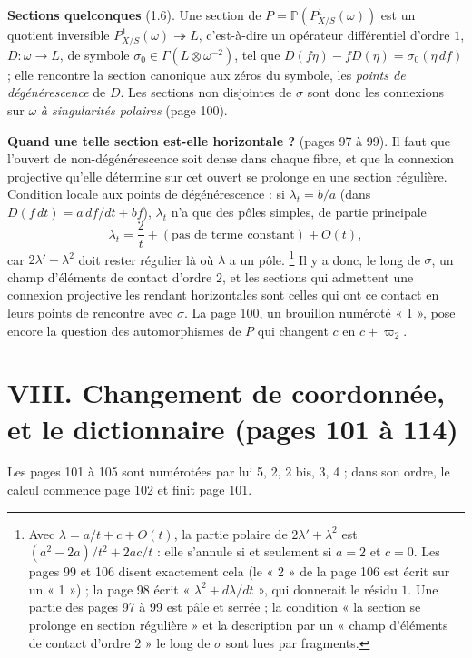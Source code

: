 \documentclass[11pt,a4paper]{article}
\begin{document}
\textbf{Sections quelconques} (1.6). Une section de $P = \mathbb{P}(P^1_{X/S}(\omega))$
est un quotient inversible $P^1_{X/S}(\omega) \twoheadrightarrow L$,
c'est-à-dire un opérateur différentiel d'ordre $1$, $D : \omega \to L$, de
symbole $\sigma_0 \in \Gamma(L \otimes \omega^{-2})$, tel que
$D(f\eta) - fD(\eta) = \sigma_0(\eta\,df)$ ; elle rencontre la section
canonique aux zéros du symbole, les \emph{points de dégénérescence} de $D$.
Les sections non disjointes de $\sigma$ sont donc les connexions sur $\omega$
\emph{à singularités polaires} (page 100).

\textbf{Quand une telle section est-elle horizontale ?} (pages 97 à 99). Il
faut que l'ouvert de non-dégénérescence soit dense dans chaque fibre, et que
la connexion projective qu'elle détermine sur cet ouvert se prolonge en une
section régulière. Condition locale aux points de dégénérescence : si
$\lambda_t = b/a$ (dans $D(f\,dt) = a\,df/dt + bf$), $\lambda_t$ n'a que des
pôles simples, de partie principale
\[
  \lambda_t = \frac{2}{t} + (\text{pas de terme constant}) +
  O(t),
\]
car $2\lambda' + \lambda^2$ doit rester régulier là où $\lambda$ a un pôle.
\footnote{Avec $\lambda = a/t + c + O(t)$, la partie polaire de $2\lambda' +
\lambda^2$ est $(a^2 - 2a)/t^2 + 2ac/t$ : elle s'annule si et seulement si
$a = 2$ et $c = 0$. Les pages 99 et 106 disent exactement cela (le « 2 » de la
page 106 est écrit sur un « 1 ») ; la page 98 écrit « $\lambda^2 +
d\lambda/dt$ », qui donnerait le résidu $1$. Une partie des pages 97 à 99 est
pâle et serrée ; la condition « la section se prolonge en section
régulière » et la description par un « champ d'éléments de contact d'ordre
$2$ » le long de $\sigma$ sont lues par fragments.} Il y a donc, le long de
$\sigma$, un champ d'éléments de contact d'ordre $2$, et les sections qui
admettent une connexion projective les rendant horizontales sont celles qui
ont ce contact en leurs points de rencontre avec $\sigma$. La page 100, un
brouillon numéroté « 1 », pose encore la question des automorphismes de $P$
qui changent $c$ en $c + \varpi_2$.

\section*{VIII. Changement de coordonnée, et le dictionnaire (pages 101 à 114)}

Les pages 101 à 105 sont numérotées par lui 5, 2, 2 bis, 3, 4 ; dans son
ordre, le calcul commence page 102 et finit page 101.
\end{document}
